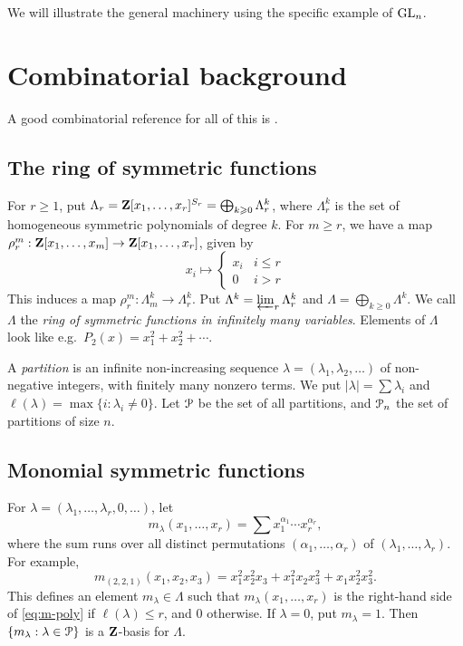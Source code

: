 \documentclass{article}
\begin{document}
We will illustrate the general machinery using the specific example of 
$\operatorname{GL}_n$. 





\section{Combinatorial background}

A good combinatorial reference for all of this is \cite{m95}. 


\subsection{The ring of symmetric functions}

For $r\geqslant 1$, put 
$\Lambda_r = \mathbf{Z}[x_1,\dots,x_r]^{S_r} = \bigoplus_{k\geqslant 0} \Lambda_r^k$, 
where $\Lambda_r^k$ is the set of homogeneous symmetric polynomials of degree 
$k$. For $m\geqslant r$, we have a map 
$\rho_r^m:\mathbf{Z}[x_1,\dots,x_m] \to \mathbf{Z}[x_1,\dots,x_r]$, given by 
\[
  x_i \mapsto \begin{cases} x_i & i\leqslant r \\ 0 & i>r \end{cases}
\]
This induces a map $\rho_r^m:\Lambda_m^k \to \Lambda_r^k$. Put 
$\Lambda^k = \varprojlim_r \Lambda_r^k$ and 
$\Lambda = \bigoplus_{k\geqslant 0} \Lambda^k$. We call $\Lambda$ the 
\emph{ring of symmetric functions in infinitely many variables}. Elements of 
$\Lambda$ look like e.g.\ $P_2(x) = x_1^2 + x_2^2 + \cdots$. 

A \emph{partition} is an infinite non-increasing sequence 
$\lambda=(\lambda_1,\lambda_2,\dots)$ of non-negative integers, with finitely 
many nonzero terms. We put $|\lambda| = \sum \lambda_i$ and 
$\ell(\lambda) = \max\{i:\lambda_i\ne 0\}$. Let $\mathcal{P}$ be the set of all 
partitions, and $\mathcal{P}_n$ the set of partitions of size $n$. 


\subsection{Monomial symmetric functions}

For $\lambda=(\lambda_1,\dots,\lambda_r,0,\dots)$, let 
\[
  m_\lambda(x_1,\dots,x_r) = \sum x_1^{\alpha_1} \dotsm x_r^{\alpha_r} ,
\]
where the sum runs over all distinct permutations $(\alpha_1,\dots,\alpha_r)$ of 
$(\lambda_1,\dots,\lambda_r)$. For example, 
\begin{equation}\label{eq:m-poly}
  m_{(2,2,1)}(x_1,x_2,x_3) = x_1^2 x_2^2 x_3 + x_1^2 x_2 x_3^2 + x_1 x_2^2 x_3^2 .
\end{equation}
This defines an element $m_\lambda\in \Lambda$ such that 
$m_\lambda(x_1,\dots,x_r)$ is the right-hand side of \eqref{eq:m-poly} if 
$\ell(\lambda)\leqslant r$, and $0$ otherwise. If $\lambda=0$, put 
$m_\lambda=1$. Then $\{m_\lambda:\lambda\in \mathcal{P}\}$ is a $\mathbf{Z}$-basis for 
$\Lambda$. 
\end{document}
